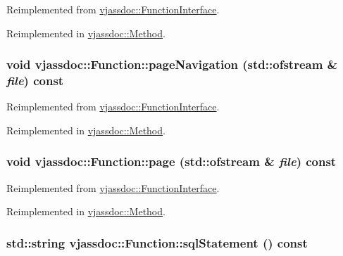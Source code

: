 Reimplemented from \hyperlink{classvjassdoc_1_1FunctionInterface_3b988163d8012beac222b27f80484242}{vjassdoc::FunctionInterface}.

Reimplemented in \hyperlink{classvjassdoc_1_1Method_cd115b1b9a459752e6613925be8e9daf}{vjassdoc::Method}.\hypertarget{classvjassdoc_1_1Function_b0776a1e111d7fcefbbcecd92f210a48}{
\subsubsection{\setlength{\rightskip}{0pt plus 5cm}void vjassdoc::Function::pageNavigation (std::ofstream \& {\em file}) const}}
\label{classvjassdoc_1_1Function_b0776a1e111d7fcefbbcecd92f210a48}




Reimplemented from \hyperlink{classvjassdoc_1_1FunctionInterface_90bd64ed95596db63699df15aa35216e}{vjassdoc::FunctionInterface}.

Reimplemented in \hyperlink{classvjassdoc_1_1Method_d5d61124a7d28d7e4680cc0df6cc5deb}{vjassdoc::Method}.\hypertarget{classvjassdoc_1_1Function_7f32865b4c3f9f4c4e6379a437f5bdfe}{
\subsubsection{\setlength{\rightskip}{0pt plus 5cm}void vjassdoc::Function::page (std::ofstream \& {\em file}) const}}
\label{classvjassdoc_1_1Function_7f32865b4c3f9f4c4e6379a437f5bdfe}




Reimplemented from \hyperlink{classvjassdoc_1_1FunctionInterface_3f5c67bb77822e08047b327f244ec364}{vjassdoc::FunctionInterface}.

Reimplemented in \hyperlink{classvjassdoc_1_1Method_564b24f8b05185ac9399dd36a9b0ad1a}{vjassdoc::Method}.\hypertarget{classvjassdoc_1_1Function_7e4a84e1bb86ade42e6a95d81d8092a7}{
\subsubsection{\setlength{\rightskip}{0pt plus 5cm}std::string vjassdoc::Function::sqlStatement () const}}
\label{classvjassdoc_1_1Function_7e4a84e1bb86ade42e6a95d81d8092a7}




